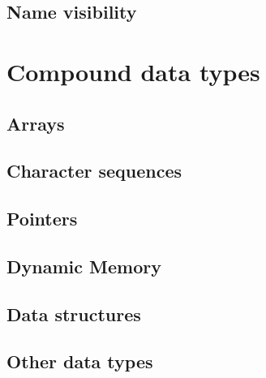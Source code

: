 \documentclass{beamer}
\begin{document}
\subsection{Name visibility}
\begin{frame}

\end{frame}

\section{Compound data types}
\subsection{Arrays}
\begin{frame}

\end{frame}

\subsection{Character sequences}
\begin{frame}

\end{frame}

\subsection{Pointers}
\begin{frame}

\end{frame}

\subsection{Dynamic Memory}
\begin{frame}

\end{frame}

\subsection{Data structures}
\begin{frame}

\end{frame}

\subsection{Other data types}
\begin{frame}

\end{frame}
\end{document}
